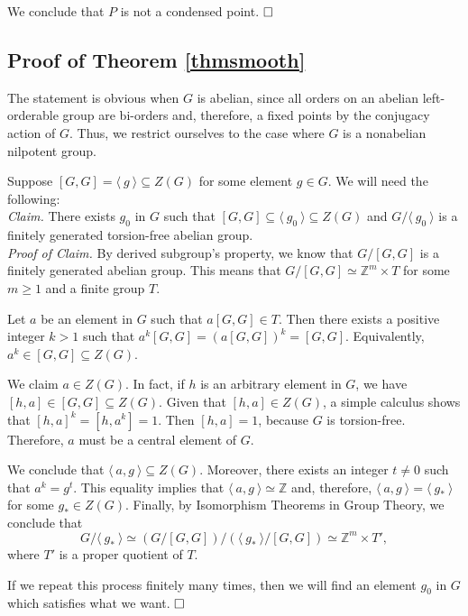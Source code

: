 \documentclass[12pt]{article}
\theoremstyle{definition}
\begin{document}
We conclude that $P$ is not a condensed point. $\hfill\square$

\subsection{Proof of Theorem \ref{thmsmooth}}

The statement is obvious when $G$ is abelian, since all orders on an abelian left-orderable group are bi-orders and, therefore, a fixed points by the conjugacy action of $G$. Thus, we restrict ourselves to the case where $G$ is a nonabelian nilpotent group.

Suppose $[G,G]=\langle\ g\ \rangle\subseteq Z(G)$ for some element $g\in G$.
We will need the following:\\

        \noindent\textit{Claim. }There exists $g_0$ in $G$ such that $[G,G]\subseteq \langle\ g_0\ \rangle \subseteq Z(G)$ and $G/\langle \ g_0\ \rangle$  is a finitely generated torsion-free abelian group.\\ 

        \noindent\textit{Proof of Claim. } By derived subgroup's property, we know that $G/[G,G]$ is a finitely generated abelian group. This means that $G/[G,G]\simeq \mathbb{Z}^m\times T$ for some $m\geq1$ and a finite group $T$. 
        
        Let $a$ be an element in $G$ such that $a[G,G]\in T$. Then there exists a positive integer $k>1$ such that $a^k[G,G]=(a[G,G])^k=[G,G]$. Equivalently, $a^k\in [G,G]\subseteq Z(G)$. 

        We claim $a\in Z(G)$. In fact, if $h$ is an arbitrary element in $G$, we have $[h,a]\in [G,G]\subseteq Z(G)$. Given that $[h,a]\in Z(G)$, a simple calculus shows that $[h,a]^k=[h,a^k]=1$. Then $[h,a]=1$, because $G$ is torsion-free. Therefore, $a$ must be a central element of $G$. 

        We conclude that $\langle\ a,g\ \rangle \subseteq Z(G)$. Moreover, there exists an integer $t\neq 0$ such that $a^k=g^t$. This equality implies that $\langle\ a,g\ \rangle\simeq\mathbb{Z}$ and, therefore, $\langle \ a,g\ \rangle=\langle\ g_*\ \rangle$ for some $g_*\in Z(G)$. 
        Finally, by Isomorphism Theorems in Group Theory, we conclude that
        $$G/\langle\ g_*\ \rangle \simeq (G/[G,G])/(\langle\ g_*\ \rangle/[G,G])\simeq \mathbb{Z}^m\times T',$$
        where $T'$ is a proper quotient of $T$. 

        If we repeat this process finitely many times, then we will find an element $g_0$ in $G$ which satisfies what we want. $\hfill\square$
        \\ 
\end{document}
